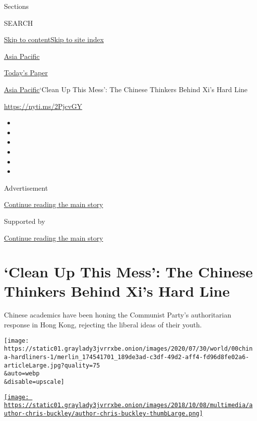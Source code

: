 Sections

SEARCH

\protect\hyperlink{site-content}{Skip to
content}\protect\hyperlink{site-index}{Skip to site index}

\href{https://www.nytimes3xbfgragh.onion/section/world/asia}{Asia
Pacific}

\href{https://myaccount.nytimes3xbfgragh.onion/auth/login?response_type=cookie\&client_id=vi}{}

\href{https://www.nytimes3xbfgragh.onion/section/todayspaper}{Today's
Paper}

\href{/section/world/asia}{Asia Pacific}\textbar{}`Clean Up This Mess':
The Chinese Thinkers Behind Xi's Hard Line

\href{https://nyti.ms/2PjcvGY}{https://nyti.ms/2PjcvGY}

\begin{itemize}
\item
\item
\item
\item
\item
\item
\end{itemize}

Advertisement

\protect\hyperlink{after-top}{Continue reading the main story}

Supported by

\protect\hyperlink{after-sponsor}{Continue reading the main story}

\hypertarget{clean-up-this-mess-the-chinese-thinkers-behind-xis-hard-line}{%
\section{`Clean Up This Mess': The Chinese Thinkers Behind Xi's Hard
Line}\label{clean-up-this-mess-the-chinese-thinkers-behind-xis-hard-line}}

Chinese academics have been honing the Communist Party's authoritarian
response in Hong Kong, rejecting the liberal ideas of their youth.

\texttt{[image: https://static01.graylady3jvrrxbe.onion/images/2020/07/30/world/00china-hardliners-1/merlin\_174541701\_189de3ad-c3df-49d2-aff4-fd96d8fe02a6-articleLarge.jpg?quality=75\\\&auto=webp\\\&disable=upscale]}

\href{https://www.nytimes3xbfgragh.onion/by/chris-buckley}{\texttt{[image: https://static01.graylady3jvrrxbe.onion/images/2018/10/08/multimedia/author-chris-buckley/author-chris-buckley-thumbLarge.png]}}

